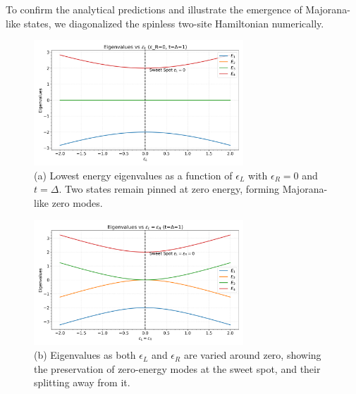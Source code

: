 \documentclass[11pt, letterpaper, titlepage]{article}
\begin{document}
To confirm the analytical predictions and illustrate the emergence of Majorana-like states, we diagonalized the spinless two-site Hamiltonian numerically.

\begin{figure}[htbp]
  \centering
  \includegraphics[width=0.7\textwidth]{../Figures/singlebody_sweetspot_eps.png}
  \caption{(a) Lowest energy eigenvalues as a function of $\epsilon_L$ with $\epsilon_R = 0$ and $t = \Delta$. Two states remain pinned at zero energy, forming Majorana-like zero modes.}
  \label{fig:sb_epsL}
\end{figure}

\begin{figure}[htbp]
  \centering
  \includegraphics[width=0.7\textwidth]{../Figures/singlebody_sweetspot_epsLR.png}
  \caption{(b) Eigenvalues as both $\epsilon_L$ and $\epsilon_R$ are varied around zero, showing the preservation of zero-energy modes at the sweet spot, and their splitting away from it.}
  \label{fig:sb_epsLR}
\end{figure}
\end{document}
